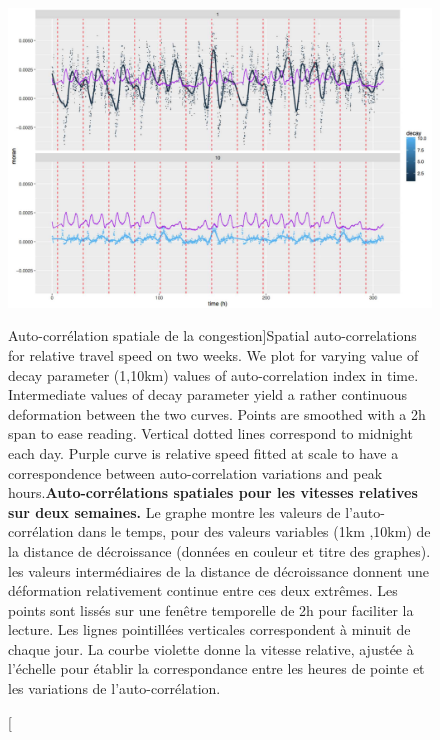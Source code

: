 \begin{figure}
\includegraphics[width=\linewidth]{Figures/Final/8-1-2-fig-transportationequilibrium-fig-5.jpg}
\caption[Spatial auto-correlations for relative travel speed][Auto-corrélation spatiale de la congestion]{Spatial auto-correlations for relative travel speed on two weeks. We plot for varying value of decay parameter (1,10km) values of auto-correlation index in time. Intermediate values of decay parameter yield a rather continuous deformation between the two curves. Points are smoothed with a 2h span to ease reading. Vertical dotted lines correspond to midnight each day. Purple curve is relative speed fitted at scale to have a correspondence between auto-correlation variations and peak hours.\label{fig:transportationequilibrium:fig-5}}{\textbf{Auto-corrélations spatiales pour les vitesses relatives sur deux semaines.} Le graphe montre les valeurs de l'auto-corrélation dans le temps, pour des valeurs variables (1km ,10km) de la distance de décroissance (données en couleur et titre des graphes). les valeurs intermédiaires de la distance de décroissance donnent une déformation relativement continue entre ces deux extrêmes. Les points sont lissés sur une fenêtre temporelle de 2h pour faciliter la lecture. Les lignes pointillées verticales correspondent à minuit de chaque jour. La courbe violette donne la vitesse relative, ajustée à l'échelle pour établir la correspondance entre les heures de pointe et les variations de l'auto-corrélation.\label{fig:transportationequilibrium:fig-5}}
\end{figure}







